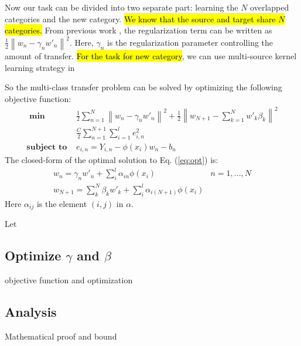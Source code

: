 Now our task can be divided into two separate part: learning the $N$ overlapped categories and the new category. 
\hl{We know that the source and target share $N$ categories.} From previous work \cite{yang2007cross}, the regularization term can be written as $\frac{1}{2}{{{\left\| {{w_n} - {\gamma _n}{{w'}_n}} \right\|}^2}}$. Here, $\gamma_n$ is the regularization parameter controlling the amount of transfer.
\hl{For the task for new category}, we can use multi-source kernel learning strategy in \cite{tommasi2014learning} 


So the multi-class transfer problem can be solved by optimizing the following objective function:
\begin{equation}\label{eq:opt}
\begin{aligned}
\textbf{  min  } & \frac{1}{2}\sum\limits_{n = 1}^N {{{\left\| {{w_n} - {\gamma _n}{{w'}_n}} \right\|}^2}}  + \frac{1}{2}{\left\| {{w_{N + 1}} - \sum\limits_{k = 1}^N {w{'_k}{\beta _k}} } \right\|^2}\\& \frac{C}{2}\sum\limits_{n = 1}^{N + 1} {\sum\limits_{i = 1}^l {e_{i,n}^2} }  \\
\textbf{subject to  } &{e_{i,n}} = {Y_{i,n}} - \phi ({x_i}){w_n} - {b_n}
\end{aligned}
\end{equation}
The closed-form of the optimal solution to  Eq. (\ref{eq:opt}) is:
\begin{equation}\label{eq:solution}
\begin{array}{*{20}{c}}
{{w_n} = {\gamma _n}{{w'}_n} + \sum\limits_i^l {{\alpha _{in}}{\phi(x_i)}} }&{n = 1,...,N}\\
{{w_{N + 1}} = \sum\limits_k^N {{\beta _k}{{w'}_k}}  + \sum\limits_i^l {{\alpha _{i(N + 1)}}{\phi(x_i)}} }&{}
\end{array}
\end{equation}
Here $\alpha_{ij}$ is the element $(i,j)$ in $\alpha$.

Let 

\subsection{Optimize $\gamma$ and $\beta$}
objective function and optimization 

\subsection{Analysis}
Mathematical proof and bound